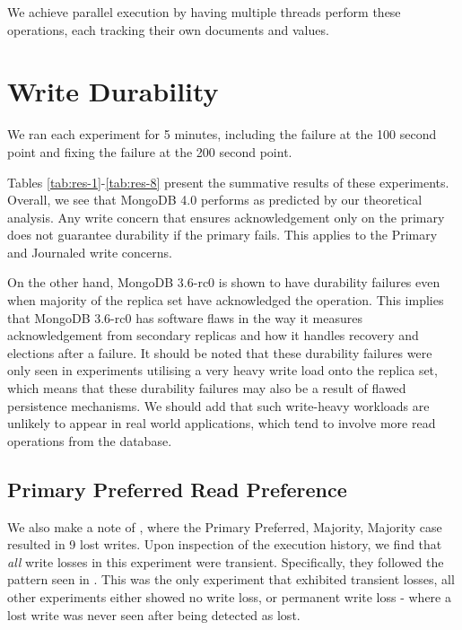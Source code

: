 We achieve parallel execution by having multiple threads perform these operations, each tracking their own documents and values.

\section{Write Durability}

We ran each experiment for 5 minutes, including the failure at the 100 second point and fixing the failure at the 200 second point. 

Tables \ref{tab:res-1}-\ref{tab:res-8} present the summative results of these experiments. Overall, we see that MongoDB 4.0 performs as predicted by our theoretical analysis. Any write concern that ensures acknowledgement only on the primary does not guarantee durability if the primary fails. This applies to the Primary and Journaled write concerns.

On the other hand, MongoDB 3.6-rc0 is shown to have durability failures even when majority of the replica set have acknowledged the operation. This implies that MongoDB 3.6-rc0 has software flaws in the way it measures acknowledgement from secondary replicas and how it handles recovery and elections after a failure. It should be noted that these durability failures were only seen in experiments utilising a very heavy write load onto the replica set, which means that these durability failures may also be a result of flawed persistence mechanisms. We should add that such write-heavy workloads are unlikely to appear in real world applications, which tend to involve more read operations from the database.

\subsection{Primary Preferred Read Preference}
We also make a note of , where the Primary Preferred, Majority, Majority case resulted in 9 lost writes. Upon inspection of the execution history, we find that \textit{all} write losses in this experiment were transient. Specifically, they followed the pattern seen in . This was the only experiment that exhibited transient losses, all other experiments either showed no write loss, or permanent write loss - where a lost write was never seen after being detected as lost.

